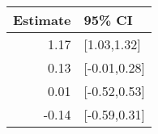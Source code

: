\begin{tabular}{rl}
  \hline
Estimate & 95\% CI \\ 
  \hline
1.17 & [1.03,1.32] \\ 
  0.13 & [-0.01,0.28] \\ 
  0.01 & [-0.52,0.53] \\ 
  -0.14 & [-0.59,0.31] \\ 
   \hline
\end{tabular}

